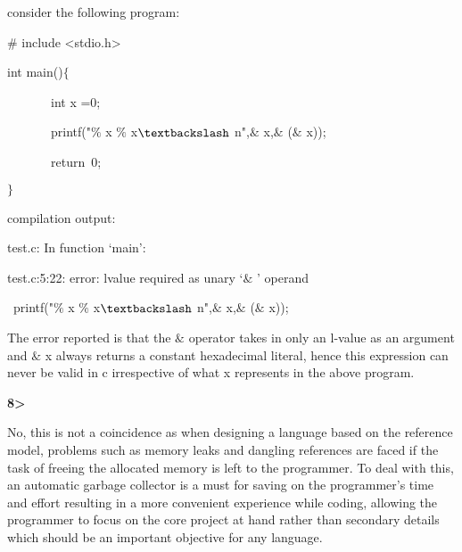 \documentclass[12pt]{article}
\renewcommand{\_}{\kern-1.5pt\textunderscore\kern-1.5pt}
\begin{document}
\vspace{\baselineskip}
consider the following program:\par


\vspace{\baselineskip}
$\#$ include <stdio.h>\par


\vspace{\baselineskip}
int main()$ \{ $ \par

\ \ \ \ \ \ \  int x =0;\par

\ \ \ \ \ \ \  printf("$\%$ x $\%$ x$\textbackslash$ n",$\&$ x,$\&$ ($\&$ x));\par

\ \ \ \ \ \ \  return\  0;\par

$ \} $ \par


\vspace{\baselineskip}
compilation output:\par

test.c: In function ‘main’:\par

test.c:5:22: error: lvalue required as unary ‘$\&$ ’ operand\par

\  printf("$\%$ x $\%$ x$\textbackslash$ n",$\&$ x,$\&$ ($\&$ x));\par


\vspace{\baselineskip}
The error reported is that the $\&$  operator takes in only an l-value as an argument and $\&$ x always returns a constant hexadecimal literal, hence this expression can never be valid in c irrespective of what x represents in the above program.\par


\vspace{\baselineskip}
\textbf{8>}\par

No, this is not a coincidence as when designing a language based on the reference model, problems such as memory leaks and dangling references are faced if the task of freeing the allocated memory is left to the programmer. To deal with this, an automatic garbage collector is a must for saving on the programmer's time and effort resulting in a more convenient experience while coding, allowing the programmer to focus on the core project at hand rather than secondary details which should be an important objective for any language.\ \ \ \  \par
\end{document}
